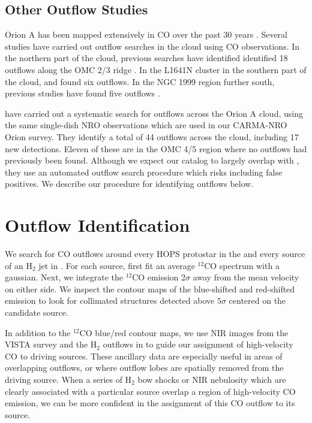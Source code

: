 \documentclass[twocolumn]{aastex63}
\newcommand{\co}[1][]{\ensuremath{^{#1}}CO}
\begin{document}
\subsection{Other Outflow Studies}
Orion A has been mapped extensively in CO over the past 30 years \citep[e.g.][]{Bally87,Wilson05,Shimajiri11,Buckle12,Ripple13,Berne14}. Several studies have carried out outflow searches in the cloud using CO observations. In the northern part of the cloud, previous searches have identified identified 18 outflows along the OMC 2/3 ridge \citep{Chini97,Aso00,Williams03,Takahashi08,Shimajiri08,Shimajiri09}. In the L1641N cluster in the southern part of the cloud, \citet{Stanke07} and \citet{Nakamura12} found six outflows. In the NGC 1999 region further south, previous studies have found five outflows \citep{Morgan91,Moro-Martin99,Davis2000,Choi17}. 

\citet{Tanabe:submitted} have carried out a systematic search for outflows across the Orion A cloud, using the same single-dish NRO observations which are used in our CARMA-NRO Orion survey. They identify a total of 44 outflows across the cloud, including 17 new detections. Eleven of these are in the OMC 4/5 region where no outflows had previously been found. Although we expect our catalog to largely overlap with \citet{Tanabe:submitted}, they use an automated outflow search procedure which risks including false positives. We describe our procedure for identifying outflows below.

\section{Outflow Identification}
\label{sec:identification}
We search for CO outflows around every HOPS protostar in the \citet{Furlan16} and every source of an H$_2$ jet in \citet{Davis09}. For each source, first fit an average \co[12] spectrum with a gaussian. Next, we integrate the \co[12] emission 2$\sigma$ away from the mean velocity on either side. We inspect the contour maps of the blue-shifted and red-shifted emission to look for collimated structures detected above $5\sigma$ centered on the candidate source.

In addition to the \co[12]{} blue/red contour maps, we use NIR images from the VISTA survey \citep{Meingast16} and the H$_2$ outflows in \citet{Davis09} to guide our assignment of high-velocity CO to driving sources. These ancillary data are especially useful in areas of overlapping outflows, or where outflow lobes are spatially removed from the driving source. When a series of H$_2$ bow shocks or NIR nebulosity which are clearly associated with a particular source overlap a region of high-velocity CO emission, we can be more confident in the assignment of this CO outflow to its source.
\end{document}

